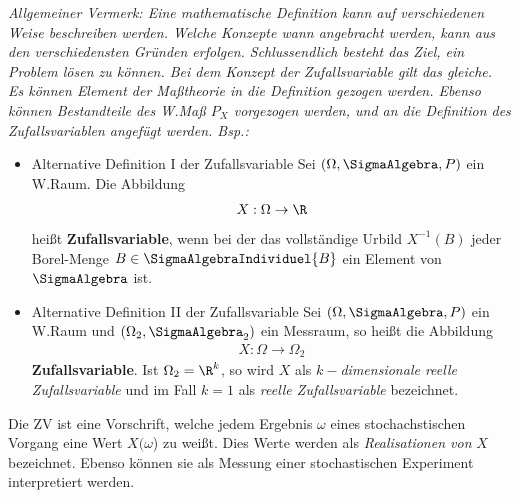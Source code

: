 \textit{Allgemeiner Vermerk: Eine mathematische Definition kann auf verschiedenen Weise beschreiben werden. Welche Konzepte wann angebracht werden, kann aus den verschiedensten Gründen erfolgen. Schlussendlich besteht das Ziel, ein Problem lösen zu können. 
Bei dem Konzept der Zufallsvariable gilt das gleiche. Es können Element der Maßtheorie in die Definition gezogen werden. Ebenso können Bestandteile des \gls{W.}Maß $P_X$ vorgezogen werden, und an die Definition des Zufallsvariablen angefügt werden. Bsp.:}
\begin{itemize}
	\item \begin{Lemma-Definition}{Alternative Definition I der Zufallsvariable}
		Sei $(\Omega, \SigmaAlgebra, P)$ ein \gls{W.}Raum. Die Abbildung
		\begin{align*}
			X: \Omega \rightarrow \R
		\end{align*}
		heißt \textbf{Zufallsvariable}, wenn bei der das vollständige Urbild $X^{-1}(B)$ jeder Borel-Menge $B\in\SigmaAlgebraIndividuel{B}$ ein Element von $\SigmaAlgebra$ ist.
	\end{Lemma-Definition}
	\item \begin{Lemma-Definition}{Alternative Definition II der Zufallsvariable}
		Sei $(\Omega, \SigmaAlgebra, P)$ ein \gls{W.}Raum und $(\Omega_2, \SigmaAlgebra_2)$ ein Messraum, so heißt die Abbildung
		\begin{align*}
			X: \Omega \rightarrow \Omega_2
		\end{align*}
		\textbf{Zufallsvariable}. Ist $\Omega_2=\R^k$, so wird $X$ als $k-$\textit{dimensionale reelle Zufallsvariable} und im Fall $k=1$ als \textit{reelle Zufallsvariable} bezeichnet.
	\end{Lemma-Definition}
\end{itemize}

Die \gls{ZV} ist eine Vorschrift, welche jedem Ergebnis $\omega$ eines stochachstischen Vorgang eine Wert $X(\omega$) zu weißt. Dies Werte werden als \textit{Realisationen von} $X$ bezeichnet. Ebenso können sie als Messung einer stochastischen Experiment interpretiert werden.
 
